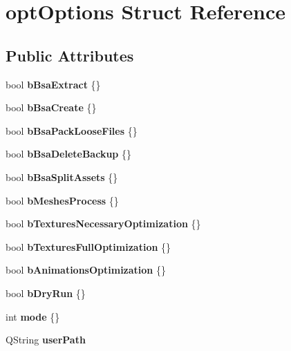 \hypertarget{structopt_options}{}\section{opt\+Options Struct Reference}
\label{structopt_options}
\subsection*{Public Attributes}
\begin{DoxyCompactItemize}
\item 
\mbox{\label{structopt_options_a1f653c4fc05ae4ee712e270958d93327}} 
bool {\bfseries b\+Bsa\+Extract} \{\}
\item 
\mbox{\label{structopt_options_a92f3afcc515a7ca0333df196012c6c64}} 
bool {\bfseries b\+Bsa\+Create} \{\}
\item 
\mbox{\label{structopt_options_a60e8d92772ea93904847af28d2055b1c}} 
bool {\bfseries b\+Bsa\+Pack\+Loose\+Files} \{\}
\item 
\mbox{\label{structopt_options_a3e2bded362a634b516136900d508afce}} 
bool {\bfseries b\+Bsa\+Delete\+Backup} \{\}
\item 
\mbox{\label{structopt_options_a9155c84e7210e528a3e8761a034215bb}} 
bool {\bfseries b\+Bsa\+Split\+Assets} \{\}
\item 
\mbox{\label{structopt_options_a6b3e4c8b115bfc2dbab407972249569f}} 
bool {\bfseries b\+Meshes\+Process} \{\}
\item 
\mbox{\label{structopt_options_ada02ee678042fca3b46e7a1de56efaa1}} 
bool {\bfseries b\+Textures\+Necessary\+Optimization} \{\}
\item 
\mbox{\label{structopt_options_a33eb70d454c597da894ecf3231375fc3}} 
bool {\bfseries b\+Textures\+Full\+Optimization} \{\}
\item 
\mbox{\label{structopt_options_a623976f8226e1d0a0628ba55f78268b4}} 
bool {\bfseries b\+Animations\+Optimization} \{\}
\item 
\mbox{\label{structopt_options_ade68c9296e602ad4b20bd8671f7cece0}} 
bool {\bfseries b\+Dry\+Run} \{\}
\item 
\mbox{\label{structopt_options_ad50b44bd13bdeaf3e65ca3f6762b7544}} 
int {\bfseries mode} \{\}
\item 
\mbox{\label{structopt_options_a3af872e4e2a4c08f54832f73daae03f5}} 
Q\+String {\bfseries user\+Path}
\end{DoxyCompactItemize}


